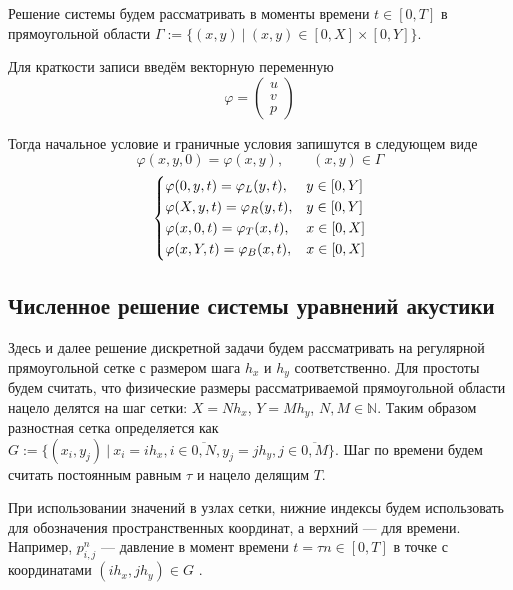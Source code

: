 Решение системы будем рассматривать в моменты времени $t \in [0, T]$ в прямоугольной области $\Gamma := \{(x,y) ~|~ (x,y) \in [0, X]\times [0, Y]\}$.

Для краткости записи введём векторную переменную
\begin{equation}
	\varphi = \begin{pmatrix} u \\ v \\ p \end{pmatrix}
\end{equation}

Тогда начальное условие и граничные условия запишутся в следующем виде
\begin{equation}
    \varphi(x,y,0) = \varphi(x,y) ,\qquad (x,y) \in \Gamma
    \label{eq:phi}
\end{equation}
\begin{equation}
\begin{dcases}
    \varphi(0,y,t) = \varphi_L (y,t) , & y \in [0,Y]\\
    \varphi(X,y,t) = \varphi_R (y,t) , & y \in [0,Y]\\
    \varphi(x,0,t) = \varphi_T (x,t) , & x \in [0,X]\\
    \varphi(x,Y,t) = \varphi_B (x,t) , & x \in [0,X]
\end{dcases}
\end{equation}

\subsection{Численное решение системы уравнений акустики}

Здесь и далее решение дискретной задачи будем рассматривать на регулярной прямоугольной сетке с размером шага $h_x$ и $h_y$ соответственно. Для простоты будем считать, что физические размеры рассматриваемой прямоугольной области нацело делятся на шаг сетки: $X=N h_x$, $Y = M h_y$, $N,M \in \mathbb{N}$. Таким образом разностная сетка определяется как $G := \{(x_i, y_j) ~|~ x_i = ih_x, i \in \overline{0,N}, y_j = jh_y, j \in \overline{0,M} \}$. Шаг по времени будем считать постоянным равным $\tau$ и нацело делящим $T$.

При использовании значений в узлах сетки, нижние индексы будем использовать для обозначения пространственных координат, а верхний --- для времени. Например, $p_{i,j}^n$ --- давление в момент времени $t=\tau n \in [0,T]$ в точке с координатами $\left(i h_x, j h_y\right) \in G$ .

